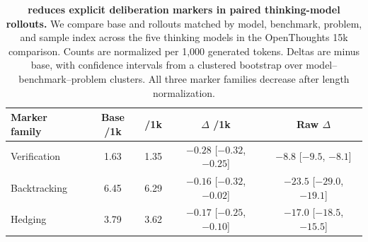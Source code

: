 \begin{table}[t]
\centering
\caption{\textbf{\opsd{} reduces explicit deliberation markers in paired thinking-model rollouts.}
We compare base and \opsd{} rollouts matched by model, benchmark, problem, and sample index across the five thinking models in the OpenThoughts 15k comparison. Counts are normalized per 1,000 generated tokens. Deltas are \opsd{} minus base, with confidence intervals from a clustered bootstrap over model--benchmark--problem clusters. All three marker families decrease after length normalization.}
\label{tab:deliberation_markers}
\small
\setlength{\tabcolsep}{4pt}
\renewcommand{\arraystretch}{1.12}
\begin{tabular*}{\linewidth}{@{\extracolsep{\fill}}lcccc@{}}
\toprule
\textbf{Marker family}
& \textbf{Base /1k}
& \textbf{\opsd{} /1k}
& \textbf{$\Delta$ /1k}
& \textbf{Raw $\Delta$} \\
\midrule
Verification
& 1.63
& 1.35
& $-0.28$ [$-0.32$, $-0.25$]
& $-8.8$ [$-9.5$, $-8.1$] \\
Backtracking
& 6.45
& 6.29
& $-0.16$ [$-0.32$, $-0.02$]
& $-23.5$ [$-29.0$, $-19.1$] \\
Hedging
& 3.79
& 3.62
& $-0.17$ [$-0.25$, $-0.10$]
& $-17.0$ [$-18.5$, $-15.5$] \\
\bottomrule
\end{tabular*}
\end{table}
